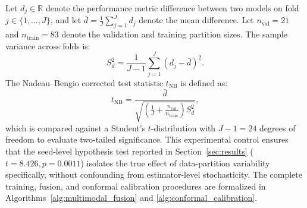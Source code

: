 \documentclass[preprint,12pt]{elsarticle}
\begin{document}
Let $d_j \in \mathbb{R}$ denote the performance metric difference between two models on fold $j \in \{1, \dots, J\}$, and let $\bar{d} = \frac{1}{J}\sum_{j=1}^J d_j$ denote the mean difference. Let $n_{\text{val}} = 21$ and $n_{\text{train}} = 83$ denote the validation and training partition sizes. The sample variance across folds is:
\begin{equation}
S_d^2 = \frac{1}{J-1} \sum_{j=1}^J \left( d_j - \bar{d} \right)^2.
\end{equation}
The Nadeau--Bengio corrected test statistic $t_{\text{NB}}$ is defined as:
\begin{equation}
t_{\text{NB}} = \frac{\bar{d}}{\sqrt{\left( \frac{1}{J} + \frac{n_{\text{val}}}{n_{\text{train}}} \right) S_d^2}},
\end{equation}
which is compared against a Student's $t$-distribution with $J-1 = 24$ degrees of freedom to evaluate two-tailed significance. This experimental control ensures that the seed-level hypothesis test reported in Section~\ref{sec:results} ($t=8.426, p=0.0011$) isolates the true effect of data-partition variability specifically, without confounding from estimator-level stochasticity. The complete training, fusion, and conformal calibration procedures are formalized in Algorithms~\ref{alg:multimodal_fusion} and \ref{alg:conformal_calibration}.
\end{document}
